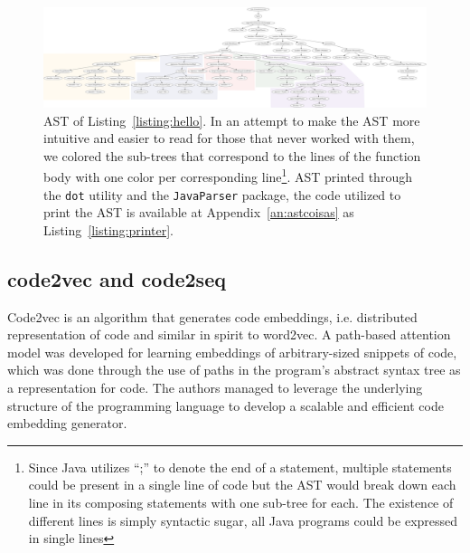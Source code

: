 \begin{landscape}
\begin{figure}[!ht]
\centerline{\includegraphics[height=0.5\textheight]{figuras/hello_astfinal_colorido.png}}
\caption{AST of Listing~\ref{listing:hello}. In an attempt to make the AST more intuitive and easier to read for those that never worked with them, we colored the sub-trees that correspond to the lines of the function body with one color per corresponding line\footnote{Since Java utilizes ``;'' to denote the end of a statement, multiple statements could be present in a single line of code but the AST would break down each line in its composing statements with one sub-tree for each. The existence of different lines is simply syntactic sugar, all Java programs could be expressed in single lines}. AST printed through the \texttt{dot} utility and the \texttt{JavaParser}  package, the code utilized to print the AST is available at Appendix~\ref{an:astcoisas} as Listing~\ref{listing:printer}.}
\label{fig:ast}
\end{figure}
\end{landscape}




\subsection{code2vec and code2seq}

Code2vec \citep{code2vec} is an algorithm that generates code embeddings, i.e. distributed representation of code and similar in spirit to word2vec. 
A path-based attention model was developed for learning embeddings of arbitrary-sized snippets of code, which was done through the use of paths in the program’s abstract syntax tree as a representation for code.
The authors managed to leverage the underlying structure of the programming language to develop a scalable and efficient code embedding generator.


